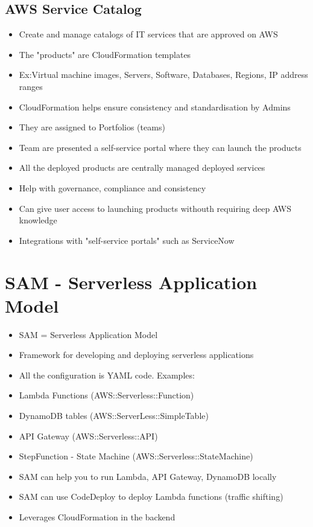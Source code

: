 \subsection{AWS Service Catalog}
\begin{itemize}
    \item Create and manage catalogs of IT services that are approved on AWS
    \item The "products" are CloudFormation templates
    \item Ex:Virtual machine images, Servers, Software, Databases, Regions, IP address ranges
    \item CloudFormation helps ensure consistency and standardisation by Admins
    \item They are assigned to Portfolios (teams)
    \item Team are presented a self-service portal where they can launch the products
    \item All the deployed products are centrally managed deployed services
    \item Help with governance, compliance and consistency
    \item Can give user access to launching products withouth requiring deep AWS knowledge
    \item Integrations with "self-service portals" such as ServiceNow
\end{itemize}


\section{SAM - Serverless Application Model}
\begin{itemize}
    \item SAM = Serverless Application Model
    \item Framework for developing and deploying serverless applications
    \item All the configuration is YAML code. Examples:
    \item Lambda Functions (AWS::Serverless::Function)
    \item DynamoDB tables (AWS::ServerLess::SimpleTable)
    \item API Gateway (AWS::Serverless::API)
    \item StepFunction - State Machine (AWS::Serverless::StateMachine)
    \item SAM can help you to run Lambda, API Gateway, DynamoDB locally
    \item SAM can use CodeDeploy to deploy Lambda functions (traffic shifting)
    \item Leverages CloudFormation in the backend
\end{itemize}

